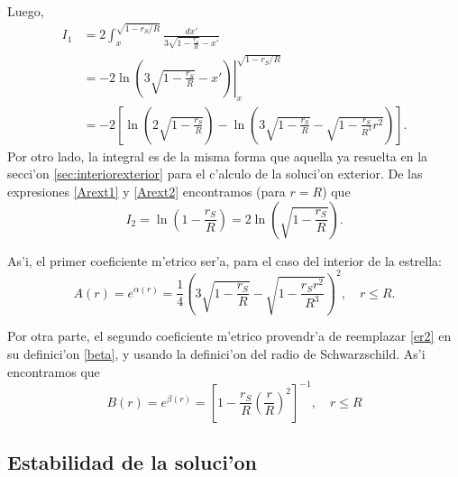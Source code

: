 Luego,
\begin{align}
I_1 &= 2\int_x^{\sqrt{1-{r_S}/{R}}}\frac{dx'}{3\sqrt{1-\frac{r_s}{R}}-x'}\\
&=-2\ln\left.\left(3\sqrt{1-\frac{r_S}{R}}-x'\right)\right|_{x}^{\sqrt{1-{r_S}/{R}}}\\
&=-2\left[\ln\left(2\sqrt{1-\frac{r_S}{R}}\right)-\ln\left(3\sqrt{1-\frac{r_S}{R}}-\sqrt{1-\frac{r_S}{R^3}r^2}\right)\right].
\end{align}
Por otro lado, la integral es de la misma forma que aquella ya resuelta en la secci'on \ref{sec:interiorexterior} para el c'alculo de la soluci'on exterior. De las expresiones \eqref{Arext1} y \eqref{Arext2} encontramos (para $r=R$) que
\begin{equation}
I_2=\ln\left(1-\frac{r_S}{R}\right)=2\ln\left(\sqrt{1-\frac{r_S}{R}}\right).
\end{equation}

As'i, el primer coeficiente m'etrico ser'a, para el caso del interior de la estrella:
\begin{equation}
\boxed{A(r)=e^{\alpha(r)}=\frac{1}{4}\left(3\sqrt{1-\frac{r_S}{R}}-\sqrt{1-\frac{r_Sr^2}{R^3}}\right)^2,\quad r\leq R.}
\end{equation}

Por otra parte, el segundo coeficiente m'etrico provendr'a de reemplazar \eqref{er2} en su definici'on \eqref{beta}, y usando la definici'on del radio de Schwarzschild. As'i encontramos que
\begin{equation}
 \boxed{B(r)=e^{\beta(r)}=\left[1-\frac{r_S}{R}\left(\frac{r}{R}\right)^2\right]^{-1},\quad r\leq R}
\end{equation}

\subsection{Estabilidad de la soluci'on}

